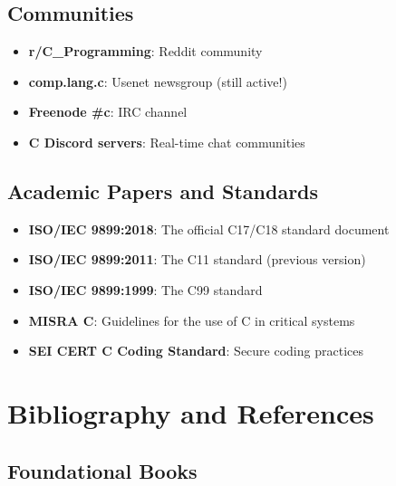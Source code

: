\documentclass[11pt,openany]{book}
\begin{document}
\section*{Communities}

\begin{itemize}
    \item \textbf{r/C\_Programming}: Reddit community
    \item \textbf{comp.lang.c}: Usenet newsgroup (still active!)
    \item \textbf{Freenode \#c}: IRC channel
    \item \textbf{C Discord servers}: Real-time chat communities
\end{itemize}

\section*{Academic Papers and Standards}

\begin{itemize}
    \item \textbf{ISO/IEC 9899:2018}: The official C17/C18 standard document
    \item \textbf{ISO/IEC 9899:2011}: The C11 standard (previous version)
    \item \textbf{ISO/IEC 9899:1999}: The C99 standard
    \item \textbf{MISRA C}: Guidelines for the use of C in critical systems
    \item \textbf{SEI CERT C Coding Standard}: Secure coding practices
\end{itemize}

\chapter{Bibliography and References}

\section*{Foundational Books}
\end{document}
